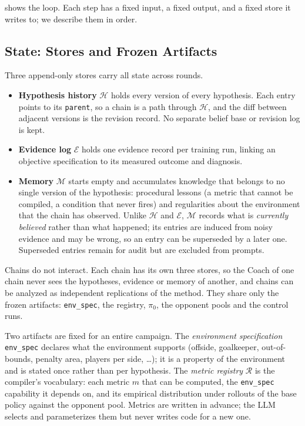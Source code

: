\documentclass[11pt]{article}
\newcommand{\Hst}{\mathcal{H}}           %
\newcommand{\Est}{\mathcal{E}}           %
\newcommand{\Mst}{\mathcal{M}}           %
\newcommand{\reg}{\mathcal{R}}           %
\newcommand{\code}[1]{\texttt{\small #1}}
\begin{document}
 shows the loop.
Each step has a fixed input, a fixed output, and a fixed store it writes to; we describe them in order.

\subsection{State: Stores and Frozen Artifacts}
\label{sec:stores}

Three append-only stores carry all state across rounds.
\begin{itemize}[leftmargin=*,itemsep=2pt]
  \item \textbf{Hypothesis history} $\Hst$ holds every version of every hypothesis.
    Each entry points to its \code{parent}, so a chain is a path through $\Hst$, and the diff between adjacent versions is the revision record.
    No separate belief base or revision log is kept.
  \item \textbf{Evidence log} $\Est$ holds one evidence record per training run, linking an objective specification to its measured outcome and diagnosis.
  \item \textbf{Memory} $\Mst$ starts empty and accumulates knowledge that belongs to no single version of the hypothesis: procedural lessons (a metric that cannot be compiled, a condition that never fires) and regularities about the environment that the chain has observed.
    Unlike $\Hst$ and $\Est$, $\Mst$ records what is \emph{currently believed} rather than what happened; its entries are induced from noisy evidence and may be wrong, so an entry can be superseded by a later one.
    Superseded entries remain for audit but are excluded from prompts.
\end{itemize}
Chains do not interact.
Each chain has its own three stores, so the Coach of one chain never sees the hypotheses, evidence or memory of another, and chains can be analyzed as independent replications of the method.
They share only the frozen artifacts: \code{env\_spec}, the registry, $\pi_0$, the opponent pools and the control runs.

Two artifacts are fixed for an entire campaign.
The \emph{environment specification} \code{env\_spec} declares what the environment supports (offside, goalkeeper, out-of-bounds, penalty area, players per side, \dots); it is a property of the environment and is stated once rather than per hypothesis.
The \emph{metric registry} $\reg$ is the compiler's vocabulary: each metric $m$ that can be computed, the \code{env\_spec} capability it depends on, and its empirical distribution under rollouts of the base policy against the opponent pool.
Metrics are written in advance; the LLM selects and parameterizes them but never writes code for a new one.
\end{document}
